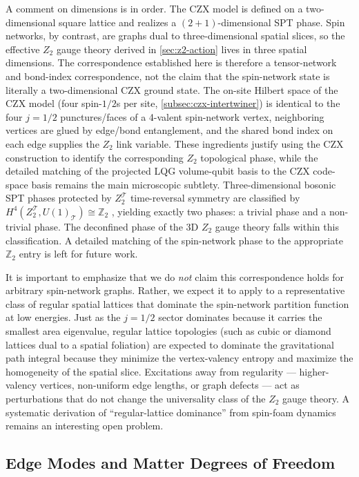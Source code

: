\documentclass[preprint]{SciPost}
\theoremstyle{plain} %
\begin{document}
A comment on dimensions is in order. The CZX model is defined on a two-dimensional square lattice and realizes a $ (2+1) $-dimensional SPT phase. Spin networks, by contrast, are graphs dual to three-dimensional spatial slices, so the effective $ Z_2 $ gauge theory derived in \autoref{sec:z2-action} lives in three spatial dimensions. The correspondence established here is therefore a tensor-network and bond-index correspondence, not the claim that the spin-network state is literally a two-dimensional CZX ground state. The on-site Hilbert space of the CZX model (four spin-$ 1/2 $s per site, \autoref{subsec:czx-intertwiner}) is identical to the four $j=1/2$ punctures/faces of a 4-valent spin-network vertex, neighboring vertices are glued by edge/bond entanglement, and the shared bond index on each edge supplies the $Z_2$ link variable. These ingredients justify using the CZX construction to identify the corresponding $Z_2$ topological phase, while the detailed matching of the projected LQG volume-qubit basis to the CZX code-space basis remains the main microscopic subtlety. Three-dimensional bosonic SPT phases protected by $ Z_2^{\mathcal{T}} $ time-reversal symmetry are classified by $ H^4(Z_2^{\mathcal{T}}, U(1)_{\mathcal{T}}) \cong \mathbb{Z}_2 $ \cite{Vishwanath2013Physics,Kapustin2014Symmetry}, yielding exactly two phases: a trivial phase and a non-trivial phase. The deconfined phase of the 3D $ Z_2 $ gauge theory falls within this classification. A detailed matching of the spin-network phase to the appropriate $ \mathbb{Z}_2 $ entry is left for future work.

It is important to emphasize that we do \emph{not} claim this correspondence holds for arbitrary spin-network graphs. Rather, we expect it to apply to a representative class of regular spatial lattices that dominate the spin-network partition function at low energies. Just as the $j=1/2$ sector dominates because it carries the smallest area eigenvalue, regular lattice topologies (such as cubic or diamond lattices dual to a spatial foliation) are expected to dominate the gravitational path integral because they minimize the vertex-valency entropy and maximize the homogeneity of the spatial slice. Excitations away from regularity — higher-valency vertices, non-uniform edge lengths, or graph defects — act as perturbations that do not change the universality class of the $Z_2$ gauge theory. A systematic derivation of ``regular-lattice dominance'' from spin-foam dynamics remains an interesting open problem.

\subsection{Edge Modes and Matter Degrees of Freedom}\label{subsec:edge-modes}
\end{document}
